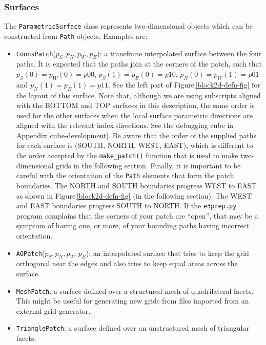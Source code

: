 \subsubsection{Surfaces}
%
The \texttt{ParametricSurface} class 
represents two-dimensional objects which can be constructed from \texttt{Path} objects.
Examples are:
\begin{itemize}
\item \texttt{CoonsPatch}($p_S, p_N, p_W, p_E$): a transfinite interpolated
  surface between the four paths.
  It is expected that the paths join at the corners of the patch, such that
  $p_S(0) = p_W(0) = p00$, $p_S(1) = p_E(0) = p10$, $p_N(0) = p_W(1) = p01$ and $p_N(1) =  p_E(1) = p11$.
  See the left part of Figure\,\ref{block2d-defn-fig} for the layout of this surface.
  Note that, although we are using subscripts aligned with the BOTTOM and TOP
  surfaces in this description, the same order is used for the other surfaces
  when the local surface parametric directions are aligned with the relevant index
  directions.
  See the debugging cube in Appendix\,\ref{cube-development}.
  Be aware that the order of the supplied paths for each surface is (SOUTH, NORTH, WEST, EAST),
  which is different to the order accepted by the \texttt{make\_patch()} function 
  that is used to make two-dimensional grids in the following section.  
  Finally, it is important to be careful with the orientation of the \texttt{Path}
  elements that form the patch boundaries.
  The NORTH and SOUTH boundaries progress WEST to EAST as shown in Figure\,\ref{block2d-defn-fig}
  (in the following section).
  The WEST and EAST boundaries progress SOUTH to NORTH.
  If the \texttt{e3prep.py} program complains that the corners of your patch are ``open'',
  that may be a symptom of having one, or more, of your bounding paths having incorrect orientation.
\item \texttt{AOPatch}($p_S, p_N, p_W, p_E$): an interpolated surface 
  that tries to keep the grid orthogonal near the edges and 
  also tries to keep equal areas across the surface.
\item \texttt{MeshPatch}: a surface defined over a structured mesh of
  quadrilateral facets.
  This might be useful for generating new grids from files imported from
  an external grid generator.
\item \texttt{TrianglePatch}: a surface defined over an unstructured mesh of
  triangular facets.

\end{itemize}
